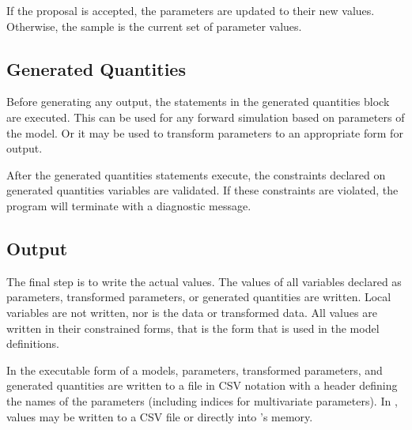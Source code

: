 \documentclass[article]{jss}
\begin{document}
If the proposal is accepted, the parameters are updated to their new
values.  Otherwise, the sample is the current set of parameter values.


\subsection{Generated Quantities} 

Before generating any output, the statements in the generated quantities 
block are executed.  This can be used for any forward simulation based
on parameters of the model.  Or it may be used to transform parameters
to an appropriate form for output.  

After the generated quantities statements execute, the constraints
declared on generated quantities variables are validated.   If these
constraints are violated, the program will terminate with a diagnostic message.

\subsection{Output}

The final step is to write the actual values.  The values of all
variables declared as parameters, transformed parameters, or generated
quantities are written.  Local variables are not written, nor is the
data or transformed data.  All values are written in their constrained
forms, that is the form that is used in the model definitions.

In the executable form of a  models, parameters,
transformed parameters, and generated quantities are written to a file
in CSV notation with a header defining the names of the parameters
(including indices for multivariate parameters).  In ,
values may be written to a CSV file or directly into 's
memory.







%

\end{document}
